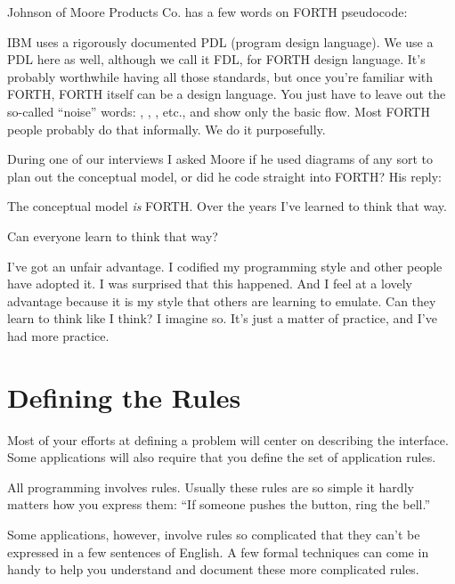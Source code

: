 \begin{interview}
Johnson of Moore Products Co. has a few words on FORTH pseudocode:

\begin{tfquot}
IBM uses a rigorously documented PDL (program design language). We use
a PDL here as well, although we call it FDL, for FORTH design
language. It's probably worthwhile having all those standards, but
once you're familiar with FORTH, FORTH itself can be a design
language. You just have to leave out the so-called ``noise'' words:
, , , etc., and show only the basic
flow. Most FORTH people probably do that informally. We do it purposefully.
\end{tfquot}
During one of our interviews I asked Moore if he used
diagrams of any sort to plan out the conceptual model, or did he code
straight into FORTH? His reply:

\begin{tfquot}
The conceptual model \emph{is} FORTH. Over the years I've learned to think that way.
\end{tfquot}
Can everyone learn to think that way?

\begin{tfquot}
I've got an unfair advantage. I codified my programming style and other
people have adopted it. I was surprised that this happened. And I feel at a
lovely advantage because it is my style that others are learning to emulate.
Can they learn to think like I think? I imagine so. It's just a matter of
practice, and I've had more practice.
\end{tfquot}
\end{interview}

\section{Defining the Rules}

Most of your efforts at defining a problem will center on describing the
interface.
Some applications will also require that you define the set of
application rules.
  
All programming involves rules. Usually these rules are so simple it
hardly matters how you express them: ``If someone pushes the button,
ring the bell.''

Some applications, however, involve rules so complicated that they
can't be expressed in a few sentences of English. A few formal techniques
can come in handy to help you understand and document these more
complicated rules.

